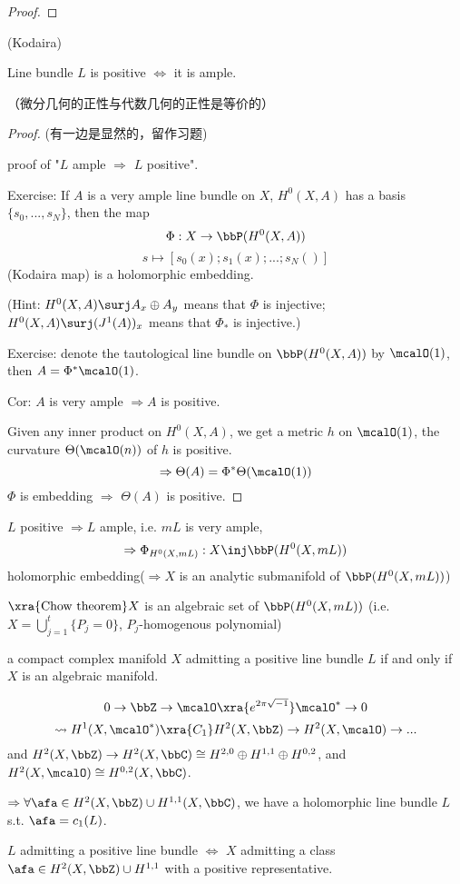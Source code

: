 \begin{proof}
\end{proof}


\begin{thm}(Kodaira)

Line bundle $L$ is positive $\iff$ it is ample.
\end{thm}

（微分几何的正性与代数几何的正性是等价的）

\begin{proof}(有一边是显然的，留作习题)

proof of "$L$ ample $\Rightarrow$ $L$ positive".

Exercise: If $A$ is a very ample line bundle on $X$,
$H^0(X,A)$ has a basis $\{s_0,...,s_N\}$, then the map
$$\Phi:X\to\bbP(H^0(X,A))$$
$$s\mapsto[s_0(x);s_1(x);...;s_N()]$$
(Kodaira map) is a holomorphic embedding.

(Hint: $H^0(X,A)\surj A_x\oplus A_y$ means that $\Phi$ is injective;
$H^0(X,A)\surj(J^1(A))_x$ means that $\Phi_*$ is injective.)

Exercise: denote the tautological line bundle on $\bbP(H^0(X,A))$
by $\mcalO(1)$, then $A=\Phi^*\mcalO(1)$.

Cor: $A$ is very ample $\Rightarrow A$ is positive.

Given any inner product on $H^0(X,A)$, we get a metric $h$ on $\mcalO(1)$,
the curvature $\Theta(\mcalO(n))$ of $h$ is positive.
$$\Rightarrow\Theta(A)=\Phi^*\Theta(\mcalO(1))$$
$\Phi$ is embedding $\Rightarrow$ $\Theta(A)$ is positive.
\end{proof}

$L$ positive $\Rightarrow L$ ample, i.e. $mL$ is very ample,
$$\Rightarrow\Phi_{H^0(X,mL)}:X\inj\bbP(H^0(X,mL))$$
holomorphic embedding($\Rightarrow X$ is an analytic submanifold of $\bbP(H^0(X,mL))$)

$\xra{\text{Chow theorem}}X$ is an algebraic set of $\bbP(H^0(X,mL))$
(i.e. $X=\bigcup\limits_{j=1}^t\{P_j=0\}$, $P_j$-homogenous polynomial)

a compact complex manifold $X$ admitting a positive line bundle $L$
if and only if $X$ is an algebraic manifold.

$$
  0\to\bbZ\to\mcalO\xra{e^{2\pi\sqrt{-1}}}\mcalO^*\to 0
$$
$$\rightsquigarrow
H^1(X,\mcalO^*)\xra{C_1}H^2(X,\bbZ)\to H^2(X,\mcalO)\to...
$$
and $H^2(X,\bbZ)\to H^2(X,\bbC)\cong H^{2,0}\oplus H^{1,1}\oplus H^{0,2}$,
and $H^2(X,\mcalO)\cong H^{0,2}(X,\bbC)$.

$\Rightarrow\forall\afa\in H^2(X,\bbZ)\cup H^{1,1}(X,\bbC)$,
we have a holomorphic line bundle $L$ s.t. $\afa=c_1(L)$.

$L$ admitting a positive line bundle $\iff$ $X$ admitting a class
$\afa\in H^{2}(X,\bbZ)\cup H^{1,1}$ with a positive representative.





 


